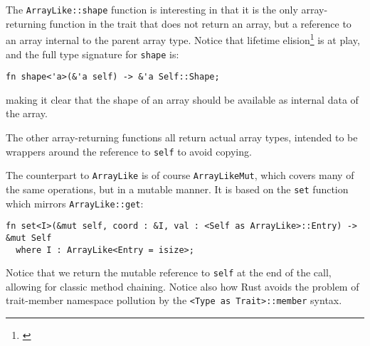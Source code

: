 \documentclass{DIKU-report-variant}
\begin{document}
The \texttt{ArrayLike::shape} function is interesting in that it is the only array-returning function in the
trait that does not return an array, but a reference to an array internal to the parent array type.
Notice that lifetime elision\footnote{\cite[chapter~3.4]{RNOM117}} is at play, and the full type signature
for \texttt{shape} is:
\begin{lstlisting}
fn shape<'a>(&'a self) -> &'a Self::Shape;
\end{lstlisting}
making it clear that the shape of an array should be available as internal data of the array.

The other array-returning functions all return actual array types, intended to be wrappers around
the reference to \texttt{self} to avoid copying.

The counterpart to \texttt{ArrayLike} is of course \texttt{ArrayLikeMut}, which covers many
of the same operations, but in a mutable manner. It is based on the \texttt{set} function which
mirrors \texttt{ArrayLike::get}:
\begin{lstlisting}
fn set<I>(&mut self, coord : &I, val : <Self as ArrayLike>::Entry) -> &mut Self
  where I : ArrayLike<Entry = isize>;
\end{lstlisting}
Notice that we return the mutable reference to \texttt{self} at the end of the call,
allowing for classic method chaining. Notice also how Rust avoids the problem of trait-member
namespace pollution by the \texttt{<Type as Trait>::member} syntax.
\end{document}
